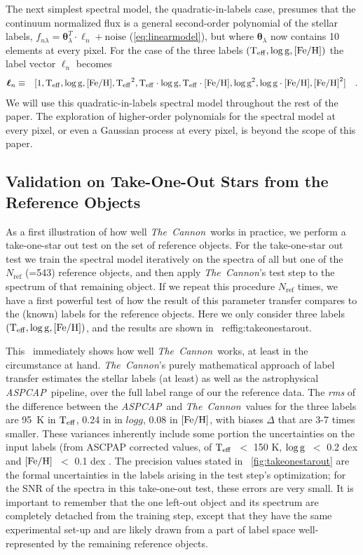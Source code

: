 \documentclass[12pt, preprint]{aastex}
\newcommand{\tc}{\textsl{The~Cannon}}
\newcommand{\aspcap}{\textsl{ASPCAP}}
\newcommand{\set}[1]{\bm{#1}}
\newcommand{\starlabel}{\ell}
\newcommand{\starlabelvec}{\set{\starlabel}}
\newcommand{\teff}{\mbox{$\rm T_{eff}$}}
\newcommand{\feh}{\mbox{$\rm [Fe/H]$}}
\newcommand{\logg}{\mbox{$\rm \log g$}}
\newcommand{\rfn}{\mathrm{ref}}
\begin{document}
The next simplest spectral model, the quadratic-in-labels case,
 presumes that the continuum normalized flux is a general second-order polynomial of the stellar labels, $f_{n\lambda} =
\set{\theta}_\lambda^T \cdot \starlabelvec_n + \mbox{noise}$ 
(\ref{eq:linearmodel}), 
but where $\set{\theta}_\lambda$ now contains 10 elements at every pixel.
For the case of the three labels $(\teff , \logg , \feh)$ the label vector $\starlabelvec_n$
becomes  
\begin{eqnarray}
\starlabelvec_n &\equiv&
[1, \teff, \logg, \feh, \teff^2, \teff\cdot\logg, \teff\cdot\feh, \logg^2, \logg\cdot\feh, \feh^2]
 \label{eq:quadinthreelabels}\quad.
\end{eqnarray}
We will use this quadratic-in-labels spectral model throughout the rest of the paper. 
The exploration of higher-order polynomials for the spectral model at every pixel, or even a Gaussian process at every pixel, is beyond the scope of this paper. 
 
\subsection{Validation on Take-One-Out Stars from the Reference Objects}
\label{sec:take-one-out}

As a first illustration of how well \tc\ works in practice, we perform a take-one-star out test on the set of reference objects.
For the take-one-star out test we train the spectral model iteratively on the spectra of all but one of the $N_\rfn$ (=543) 
reference objects, and then apply \tc 's test step to the spectrum of that remaining object. If we repeat this procedure $N_\rfn$ times, 
we have a first powerful test of how the result of this parameter transfer compares to the (known) labels for the reference objects.
 Here we only consider three labels $(\teff , \logg , \feh)$, and the results are shown in \figurename~ref{fig:takeonestarout}.

This \figurename\ immediately shows how well \tc\ works, at least in the circumstance at hand.
\tc 's purely mathematical approach of label transfer estimates the stellar labels (at least) as well as the astrophysical \aspcap\ pipeline,
over the full label range of our the reference data. The \textit{rms} of the difference between the \aspcap\ and \tc\ values for the three labels are
95~K in $\teff$, 0.24 in in $logg$, 0.08 in $\feh$, with biases $\Delta$ that are 3-7 times smaller.  
These variances inherently include some portion the uncertainties on the input labels (from ASCPAP corrected values, 
of \teff\ $<$ 150 K, \logg\ $<$ 0.2 dex and \feh\ $<$ 0.1 dex \citep{Meszaros2013}.
The precision values stated in \figurename~\ref{fig:takeonestarout} are the formal uncertainties in the labels arising 
in the test step's optimization; for the SNR of the spectra in this take-one-out test, these errors are very small.
It is important to remember that the one left-out object and its spectrum are completely detached from the training step, 
except that they have the same experimental set-up and are likely drawn from a part of label space well-represented by the remaining reference objects.
\end{document}
